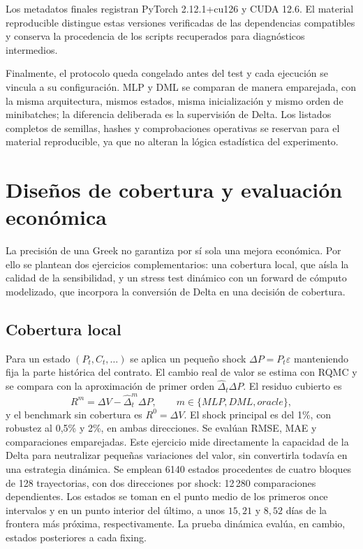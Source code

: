 Los metadatos finales registran PyTorch 2.12.1+cu126 y CUDA 12.6. El material
reproducible distingue estas versiones verificadas de las dependencias compatibles
y conserva la procedencia de los scripts recuperados para diagnósticos intermedios.

Finalmente, el protocolo queda congelado antes del test y cada ejecución se
vincula a su configuración. MLP y DML se comparan de manera emparejada, con la
misma arquitectura, mismos estados, misma inicialización y mismo orden de
minibatches; la diferencia deliberada es la supervisión de Delta. Los listados
completos de semillas, hashes y comprobaciones operativas se reservan para el
material reproducible, ya que no alteran la lógica estadística del experimento.


\section{Diseños de cobertura y evaluación económica}
\label{sec:hedging_design}

La precisión de una Greek no garantiza por sí sola una mejora económica. Por
ello se plantean dos ejercicios complementarios: una cobertura local, que aísla
la calidad de la sensibilidad, y un stress test dinámico con un forward de
cómputo modelizado, que incorpora la conversión de Delta en una decisión de
cobertura.

\subsection*{Cobertura local}

Para un estado $(P_t,C_t,\ldots)$ se aplica un pequeño shock
$\Delta P=P_t\varepsilon$ manteniendo fija la parte histórica del contrato. El
cambio real de valor se estima con RQMC y se compara con la aproximación de
primer orden $\widehat\Delta_t\Delta P$. El residuo cubierto es
\begin{equation}
    R^{m}=\Delta V-\widehat\Delta_t^{m}\Delta P,
    \qquad m\in\{MLP,DML,oracle\},
    \label{eq:local_hedge_residual}
\end{equation}
y el benchmark sin cobertura es $R^0=\Delta V$. El shock principal es del 1\%,
con robustez al 0{,}5\% y 2\%, en ambas direcciones. Se evalúan RMSE, MAE y
comparaciones emparejadas. Este ejercicio mide directamente la capacidad de la
Delta para neutralizar pequeñas variaciones del valor, sin convertirla todavía
en una estrategia dinámica. Se emplean 6140 estados procedentes de cuatro bloques
de 128 trayectorias, con dos direcciones por shock: 12\,280 comparaciones dependientes.
Los estados se toman en el punto medio de los primeros once intervalos y en un
punto interior del último, a unos $15{,}21$ y $8{,}52$ días de la frontera más próxima,
respectivamente. La prueba dinámica evalúa, en cambio, estados posteriores a cada fixing.

